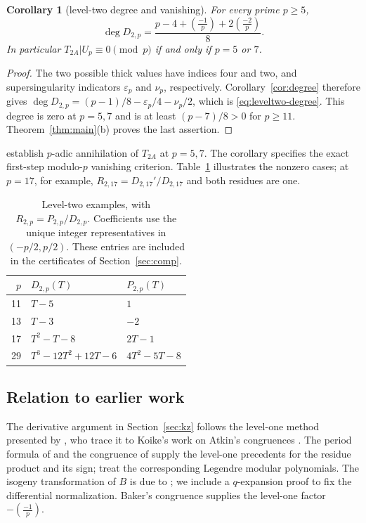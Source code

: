 \documentclass[11pt,a4paper]{article}
\numberwithin{equation}{section}
\newtheorem{corollary}[theorem]{Corollary}
\theoremstyle{definition}
\theoremstyle{remark}
\begin{document}
\begin{corollary}[level-two degree and vanishing]\label{cor:leveltwo-vanishing}
For every prime $p\ge5$,
\begin{equation}\label{eq:leveltwo-degree}
\deg D_{2,p}=\frac{p-4+\left(\frac{-1}{p}\right)+2\left(\frac{-2}{p}\right)}8.
\end{equation}
In particular $T_{2A}|U_p\equiv0\pmod p$ if and only if $p=5$ or $7$.
\end{corollary}
\begin{proof}
The two possible thick values have indices four and two, and supersingularity
indicators $\varepsilon_p$ and $\nu_p$, respectively. Corollary~\ref{cor:degree}
therefore gives
$\deg D_{2,p}=(p-1)/8-\varepsilon_p/4-\nu_p/2$, which is
\eqref{eq:leveltwo-degree}. This degree is zero at $p=5,7$ and is at least
$(p-7)/8>0$ for $p\ge11$. Theorem~\ref{thm:main}(b) proves the last assertion.
\end{proof}

\citet[Lemma~4.8 and Table~4.3]{CMT19} establish $p$-adic
annihilation of $T_{2A}$ at $p=5,7$. The corollary specifies the exact
first-step modulo-$p$ vanishing criterion. Table~\ref{tab:leveltwo-examples}
illustrates the nonzero cases; at $p=17$, for example,
$R_{2,17}=D_{2,17}'/D_{2,17}$ and both residues are one.

\begin{table}[htbp]\centering
\begin{tabular}{rll}\toprule
$p$ & $D_{2,p}(T)$ & $P_{2,p}(T)$\\\midrule
11 & $T-5$ & $1$\\
13 & $T-3$ & $-2$\\
17 & $T^2-T-8$ & $2T-1$\\
29 & $T^3-12T^2+12T-6$ & $4T^2-5T-8$\\\bottomrule
\end{tabular}
\caption{Level-two examples, with $R_{2,p}=P_{2,p}/D_{2,p}$.
Coefficients use the unique integer representatives in $(-p/2,p/2)$.
These entries are included in the certificates of Section~\ref{sec:comp}.}
\label{tab:leveltwo-examples}
\end{table}

\subsection{Relation to earlier work}
The derivative argument in Section~\ref{sec:kz} follows the level-one method
presented by \citet[\S10]{KZ98}, who trace it to Koike's work
on Atkin's congruences \citep{Koike73}. The period formula of \citet{dS94}
and the congruence of \citet{Baker98} supply the level-one precedents for the
residue product and its sign; \citet{BL18} treat the corresponding Legendre
modular polynomials. The isogeny transformation of $B$ is due to
\citet[Th\'eor\`eme B, p.~106; \S3.3, Lemma~7 and (19), p.~124]{Robert80};
we include a $q$-expansion proof to fix the differential normalization.
Baker's congruence supplies the level-one factor $-\left(\frac{-1}{p}\right)$.
\end{document}
